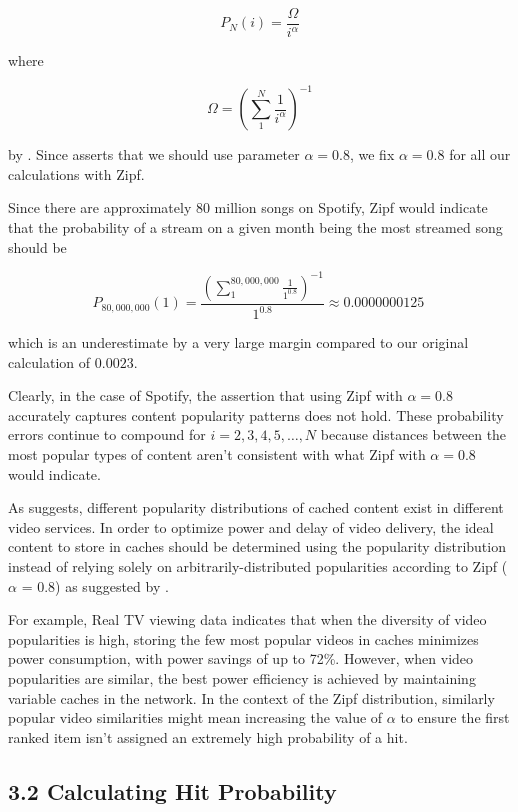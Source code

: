 \documentclass[
	a4paper, %
	10pt, %
	unnumberedsections, %
	twoside, %
]{LTJournalArticle}
\begin{document}
\[
	P_N(i) = \frac{\Omega}{i^{\alpha}}
\] 

where 

\[
	\Omega = \left(\sum_{1}^{N} \frac{1}{i^{\alpha}}\right)^{-1}
\] 

by \cite{749260}. Since \cite{biancoCDNs2017} asserts that we should use parameter $\alpha = 0.8$, we fix $\alpha = 0.8$ for all our calculations with Zipf. 

Since there are approximately $80$ million songs on Spotify, Zipf would indicate that the probability of a stream on a given month being the most streamed song should be 

\[
	P_{80,000,000}(1) = \frac{\left(\sum_{1}^{80,000,000} \frac{1}{1^{0.8}}
	\right)^{-1}}{1^{0.8}} \approx 0.0000000125 \
\] 

which is an underestimate by a very large margin compared to our original calculation of $0.0023$.

Clearly, in the case of Spotify, the assertion that using Zipf with $\alpha = 0.8$ accurately captures content popularity patterns does not hold. These probability errors continue to compound for $i = 2, 3, 4, 5, \ldots, N$ because distances between the most popular types of content aren't consistent with what Zipf with $\alpha = 0.8$ would indicate. 

As \cite{osmanthesis} suggests, different popularity distributions of cached content exist in different video services. In order to optimize power and delay of video delivery, the ideal content to store in caches should be determined using the popularity distribution instead of relying solely on arbitrarily-distributed popularities according to Zipf ($\alpha$ = 0.8) as suggested by \cite{biancoCDNs2017}. 

For example, Real TV viewing data indicates that when the diversity of video popularities is high, storing the few most popular videos in caches minimizes power consumption, with power savings of up to 72\%. However, when video popularities are similar, the best power efficiency is achieved by maintaining variable caches in the network. In the context of the Zipf distribution, similarly popular video similarities might mean increasing the value of $\alpha$ to ensure the first ranked item isn't assigned an extremely high probability of a hit.


\subsection{3.2 Calculating Hit Probability}
\end{document}
